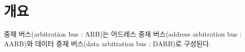 \section{개요}
중재 버스(arbitration bus : ARB)는 어드레스 중재 버스(address arbitration
bus : AARB)와 데이터 중재 버스(data arbitration bus : DARB)로 구성된다.
%

%
